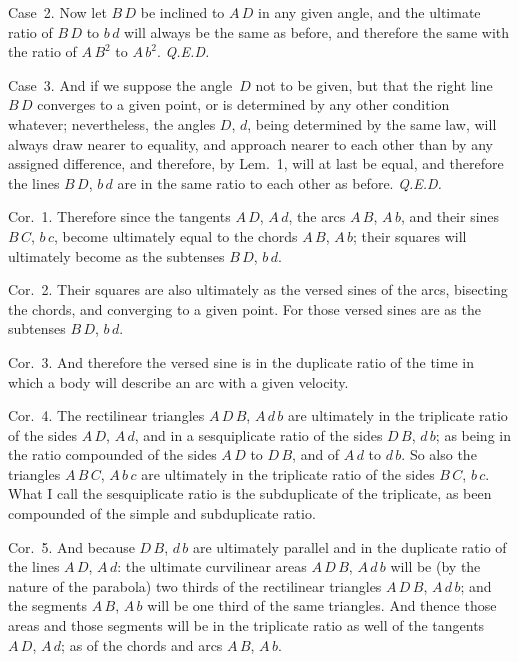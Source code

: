{\sc Case}~2.
Now let $B \, D$ be inclined to $A \, D$ in any given angle, and
the ultimate ratio of $B \, D$ to $b \, d$ will always be the
same as before, and therefore the same with the ratio of
$A \, B^2$ to $A \, b^2$.
{\it Q.E.D.}

{\sc Case}~3.
And if we suppose the angle~$D$ not to be given, but that
the right line $B \, D$ converges to a given point, or is
determined by any other condition whatever; nevertheless, the
angles $D$, $d$, being determined by the same law,
will always draw nearer to equality, and approach nearer to each
other than by any assigned difference, and therefore, by Lem.~1,
will at last be equal, and therefore the lines $B \, D$, $b \, d$
are in the same ratio to each other as before.
{\it Q.E.D.}

{\sc Cor.}~1.
Therefore since the tangents $A \, D$, $A \, d$, the arcs
$A \, B$, $A \, b$, and their sines $B \, C$, $b \, c$, become
ultimately equal to the chords $A \, B$, $A \, b$; their squares
will ultimately become as the subtenses $B \, D$, $b \, d$.

{\sc Cor.}~2.
Their squares are also ultimately as the versed sines of the
arcs, bisecting the chords, and converging to a given point.  For
those versed sines are as the subtenses $B \, D$, $b \, d$.

{\sc Cor.}~3.
And therefore the versed sine is in the duplicate ratio of the
time in which a body will describe an arc with a given velocity.

{\sc Cor.}~4.
The rectilinear triangles $A \, D \, B$, $A \, d \, b$ are
ultimately in the triplicate ratio of the sides $A \, D$,
$A \, d$, and in a sesquiplicate ratio of the sides $D \, B$, $d
\, b$; as being in the ratio compounded of the sides $A \, D$ to
$D \, B$, and of $A \, d$ to $d \, b$.  So also the triangles
$A \, B \, C$, $A \, b \, c$ are ultimately in the triplicate
ratio of the sides $B \, C$, $b \, c$.  What I call the
sesquiplicate ratio is the subduplicate of the triplicate, as
been compounded of the simple and subduplicate ratio.

{\sc Cor.}~5.
And because $D \, B$, $d \, b$ are ultimately parallel and in the
duplicate ratio of the lines $A \, D$, $A \, d$: the ultimate
curvilinear areas $A \, D \, B$, $A \, d \, b$ will be (by the
nature of the parabola) two thirds of the rectilinear triangles
$A \, D \, B$, $A \, d \, b$; and the segments $A \, B$, $A \, b$
will be one third of the same triangles.  And thence those areas
and those segments will be in the triplicate ratio as well of the
tangents $A \, D$, $A \, d$; as of the chords and arcs $A \, B$,
$A \, b$.


